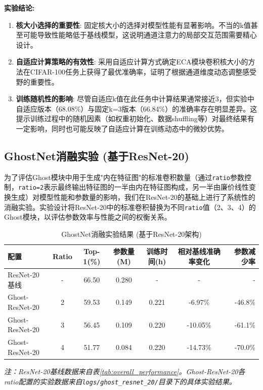 \documentclass[a4paper]{article}
\begin{document}
\begin{description}
\textbf{实验结论:}
\begin{enumerate}
    \item \textbf{核大小选择的重要性}: 固定核大小的选择对模型性能有显著影响。不当的k值甚至可能导致性能略低于基线模型，这说明通道注意力的局部交互范围需要精心设计。
    \item \textbf{自适应计算策略的有效性}: 采用自适应计算方式确定ECA模块卷积核大小的方法在CIFAR-100任务上获得了最优准确率，证明了根据通道维度动态调整感受野的重要性。
    \item \textbf{训练随机性的影响}: 尽管自适应k值在此任务中计算结果通常接近3，但实验中自适应版本（68.08\%）与固定k=3版本（66.84\%）的准确率存在明显差异。这提示训练过程中的随机因素（如权重初始化、数据shuffling等）对最终结果有一定影响，同时也可能反映了自适应计算在训练动态中的微妙优势。
\end{enumerate}

\subsection{GhostNet消融实验 (基于ResNet-20)}
为了评估Ghost模块中用于生成"内在特征图"的标准卷积数量（通过\texttt{ratio}参数控制，\texttt{ratio=2}表示最终输出特征图的一半由内在特征图构成，另一半由廉价线性变换生成）对模型性能和参数量的影响，我们在ResNet-20的基础上进行了系统性的消融实验。实验设计将ResNet-20中的标准卷积替换为不同\texttt{ratio}值（2、3、4）的Ghost模块，以评估参数效率与性能之间的权衡关系。

\begin{table}[H]
\centering
\caption{GhostNet消融实验结果 (基于ResNet-20架构)}
\label{tab:ghost_ablation}
\begin{tabular}{lcccccr}
\toprule
\textbf{配置} & \textbf{Ratio} & \textbf{Top-1(\%)} & \textbf{参数量(M)} & \textbf{训练时间(h)} & \textbf{相对基线准确率变化} & \textbf{参数减少率} \\
\midrule
ResNet-20 基线 & - & 66.50 & 0.280 & - & - & - \\
Ghost-ResNet-20 & 2 & 59.53 & 0.149 & 0.221 & -6.97\% & -46.8\% \\
Ghost-ResNet-20 & 3 & 56.45 & 0.109 & 0.220 & -10.05\% & -61.1\% \\
Ghost-ResNet-20 & 4 & 51.77 & 0.084 & 0.220 & -14.73\% & -70.0\% \\
\bottomrule
\end{tabular}
\end{table}
\textit{注：ResNet-20基线数据来自表\ref{tab:overall_performance}。Ghost-ResNet-20各ratio配置的实验数据来自\texttt{logs/ghost\_resnet\_20/}目录下的具体实验结果。}


\end{description}
\end{document}
